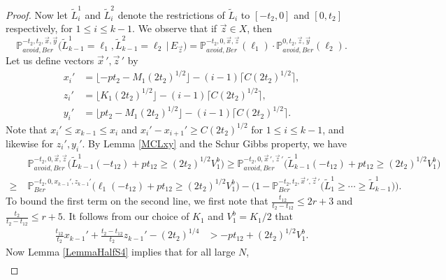 \begin{proof}
	Now let $\tilde{L}_i^1$ and $\tilde{L}_i^2$ denote the restrictions of $\tilde{L}_i$ to $[-t_2,0]$ and $[0,t_2]$ respectively, for $1\leq i\leq k-1$. We observe that if $\vec{z}\in X$, then
	\begin{equation}\label{5.10split}
	\mathbb{P}^{-t_2,t_2,\vec{x},\vec{y}}_{avoid,Ber}\big(\tilde{L}^1_{k-1} = \ell_1, \tilde{L}^2_{k-1} = \ell_2 \, |\, E_{\vec{z}}\big) = \mathbb{P}^{-t_2,0,\vec{x},\vec{z}}_{avoid,Ber}(\ell_1)\cdot\mathbb{P}^{0,t_2,\vec{z},\vec{y}}_{avoid,Ber}(\ell_2).
	\end{equation}
	Let us define vectors $\vec{x}\,', \vec{z}\,'$ by
	\begin{align*}
	x_i' &= \lfloor -pt_2 - M_1(2t_2)^{1/2}\rfloor - (i-1)\lceil C(2t_2)^{1/2}\rceil,\\
	z_i' &= \lfloor K_1(2t_2)^{1/2}\rfloor - (i-1)\lceil C(2t_2)^{1/2}\rceil,\\
	y_i' &= \lfloor pt_2 - M_1(2t_2)^{1/2}\rfloor - (i-1)\lceil C(2t_2)^{1/2}\rceil.
	\end{align*}
	Note that $x_i' \leq x_{k-1} \leq x_i$ and $x_i' - x_{i+1}' \geq C(2t_2)^{1/2}$ for $1\leq i\leq k - 1$, and likewise for $z_i',y_i'$. By Lemma \ref{MCLxy} and the Schur Gibbs property, we have
	\begin{equation}\label{5.10separate}
	\begin{split}
	&\mathbb{P}^{-t_2,0,\vec{x},\vec{z}}_{avoid,Ber}\Big(\tilde{L}^1_{k-1}(-t_{12}) + pt_{12} \geq (2t_2)^{1/2}V_1^b\Big) \geq \mathbb{P}^{-t_2,0,\vec{x}\,',\vec{z}\,'}_{avoid,Ber}\Big(\tilde{L}^1_{k-1}(-t_{12}) + pt_{12} \geq (2t_2)^{1/2}V_1^b\Big)\\ \geq \; & \mathbb{P}^{-t_2,0,x_{k-1}',z_{k-1}'}_{Ber}\Big(\ell_1(-t_{12}) + pt_{12} \geq (2t_2)^{1/2}V_1^b\Big) - \big( 1 - \mathbb{P}^{-t_2,t_2,\vec{x}\,',\vec{z}\,'}_{Ber}\big(\tilde{L}^1_1 \geq \cdots \geq \tilde{L}_{k-1}^1\big)\big).
	\end{split}
	\end{equation} 
	To bound the first term on the second line, we first note that $\frac{t_{12}}{t_2-t_{12}} \leq 2r+3$ and $\frac{t_2}{t_2-t_{12}} \leq r+5$. It follows from our choice of $K_1$ and $V_1^b = K_1/2$ that 
	\begin{align*}
	\frac{t_{12}}{t_2}x_{k-1}' + \frac{t_2-t_{12}}{t_2}z_{k-1}' - (2t_2)^{1/4} &> -pt_{12} + (2t_2)^{1/2}V_1^b.
	\end{align*}
	Now Lemma \ref{LemmaHalfS4} implies that for all large $N$,
	\begin{equation}\label{5.10third}
	\begin{split}

\end{split}
\end{equation}
\end{proof}
